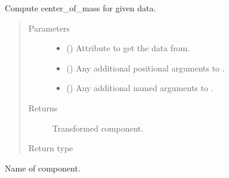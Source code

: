 \documentclass[letterpaper,10pt,english]{sphinxmanual}
\begin{document}
\begin{fulllineitems}
\begin{fulllineitems}
\label{\detokenize{api/rock:geology.src.Rock.center_of_mass}}
Compute center\_of\_mass for given data.
\begin{quote}\begin{description}
\item[{Parameters}] \leavevmode\begin{itemize}
\item {} 
 (\sphinxstyleliteralemphasis{\sphinxupquote{, }}) \textendash{} Attribute to get the data from.

\item {} 
 () \textendash{} Any additional positional arguments to .

\item {} 
 () \textendash{} Any additional named arguments to .

\end{itemize}

\item[{Returns}] \leavevmode
{} \textendash{} Transformed component.

\item[{Return type}] \leavevmode
{\hyperref[\detokenize{api/base_classes:geology.src.base_spatial.SpatialComponent}]{}}

\end{description}\end{quote}

\end{fulllineitems}


\begin{fulllineitems}
\label{\detokenize{api/rock:geology.src.Rock.class_name}}
Name of component.


\end{fulllineitems}
\end{fulllineitems}
\end{document}
